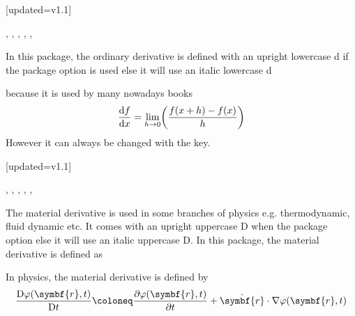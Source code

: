 	\begin{function}{\odv}[updated=v1.1]
		\begin{syntax}
			\sarg, , , \targ{/}, , 
		\end{syntax}
		In this package, the ordinary derivative is defined with an upright lowercase d if the package option  is used else it will use an italic lowercase d
		\begin{definition}
		\end{definition}
		because it is used by many nowadays books
		\begin{equation*}
			\odv{f}{x} = \lim_{h\to 0} \mleft( \frac{ f(x+h) - f(x) }{ h } \mright)
		\end{equation*}
		However it can always be changed with the  key.
	\end{function}
	
	\begin{function}{\mdv}[updated=v1.1]
		\begin{syntax}
			\sarg, , , \targ{/}, , \earg{\_, point\tsb{1}, \^, point\tsb{2}}
		\end{syntax}
		The material derivative is used in some branches of physics e.g. thermodynamic, fluid dynamic etc. It comes with an upright uppercase D when the package option  else it will use an italic uppercase D. In this package, the material derivative is defined as
		
		\begin{definition}
		\end{definition}
		
		\noindent In physics, the material derivative is defined by
		\begin{equation*}
			\mdv{ \varphi(\symbf{r}, t) }{ t } \coloneq \pdv{ \varphi(\symbf{r}, t) }{ t } + \dot{\symbf{r}} \cdot \nabla \varphi(\symbf{r}, t)
		\end{equation*}
	\end{function}
	
